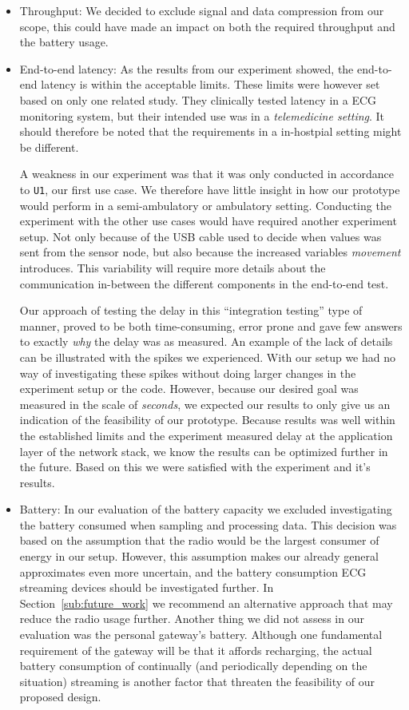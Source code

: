 \begin{itemize}

  \item Throughput: We decided to exclude signal and data compression from our scope, this could have made an impact on both the required throughput and the battery usage. 
  \item End-to-end latency: As the results from our experiment showed, the end-to-end latency is within the acceptable limits. These limits were however set based on only one related study. They clinically tested latency in a ECG monitoring system, but their intended use was in a \emph{telemedicine setting}. It should therefore be noted that the requirements in a in-hostpial setting might be different.
  
  A weakness in our experiment was that it was only conducted in accordance to \texttt{U1}, our first use case. We therefore have little insight in how our prototype would perform in a semi-ambulatory or ambulatory setting. Conducting the experiment with the other use cases would have required another experiment setup. Not only because of the USB cable used to decide when values was sent from the sensor node, but also because the increased variables \emph{movement} introduces. This variability will require more details about the communication in-between the different components in the end-to-end test. 
  
  Our approach of testing the delay in this ``integration testing'' type of manner, proved to be both time-consuming, error prone and gave few answers to exactly \emph{why} the delay was as measured. An example of the lack of details can be illustrated with the spikes we experienced. With our setup we had no way of investigating these spikes without doing larger changes in the experiment setup or the code. However, because our desired goal was measured in the scale of \emph{seconds}, we expected our results to only give us an indication of the feasibility of our prototype. Because results was well within the established limits and the experiment measured delay at the application layer of the network stack, we know the results can be optimized further in the future. Based on this we were satisfied with the experiment and it's results.
  \item Battery: In our evaluation of the battery capacity we excluded investigating the battery consumed when sampling and processing data. This decision was based on the assumption that the radio would be the largest consumer of energy in our setup. However, this assumption makes our already general approximates even more uncertain, and the battery consumption ECG streaming devices should be investigated further. In Section~\ref{sub:future_work} we recommend an alternative approach that may reduce the radio usage further. Another thing we did not assess in our evaluation was the personal gateway's battery. Although one fundamental requirement of the gateway will be that it affords recharging, the actual battery consumption of continually (and periodically depending on the situation) streaming is another factor that threaten the feasibility of our proposed design.

\end{itemize}


